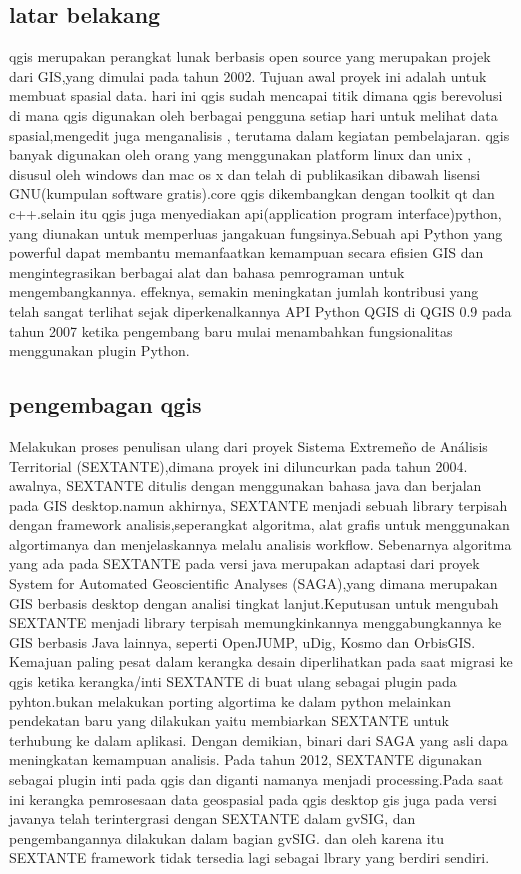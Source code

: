 	 \subsection{latar belakang}
		qgis merupakan perangkat lunak berbasis open source yang merupakan projek dari GIS,yang dimulai pada tahun 2002. Tujuan awal proyek ini adalah untuk membuat spasial data. hari ini qgis sudah mencapai titik dimana qgis berevolusi di mana qgis digunakan oleh berbagai pengguna setiap hari untuk melihat data spasial,mengedit juga menganalisis , terutama dalam kegiatan pembelajaran.
	 qgis banyak digunakan oleh orang yang menggunakan platform linux dan unix , disusul oleh windows dan mac os x dan telah di publikasikan dibawah lisensi GNU(kumpulan software gratis).core qgis dikembangkan dengan toolkit qt dan c++.selain itu qgis juga menyediakan api(application program interface)python, yang diunakan untuk memperluas jangakuan fungsinya.Sebuah api Python yang powerful dapat membantu memanfaatkan kemampuan secara efisien GIS dan mengintegrasikan berbagai alat dan bahasa pemrograman untuk mengembangkannya. 
	 effeknya, semakin meningkatan jumlah kontribusi yang telah sangat terlihat sejak diperkenalkannya API Python QGIS di QGIS 0.9 pada tahun 2007 ketika pengembang baru mulai menambahkan fungsionalitas menggunakan plugin Python.
	 
	 \subsection{pengembagan qgis}
		Melakukan proses penulisan ulang dari proyek Sistema Extremeño de Análisis Territorial (SEXTANTE),dimana proyek ini diluncurkan pada tahun 2004. awalnya, SEXTANTE ditulis dengan menggunakan bahasa java dan berjalan pada GIS desktop.namun akhirnya, SEXTANTE menjadi sebuah library terpisah dengan framework analisis,seperangkat algoritma, alat grafis untuk menggunakan algortimanya dan menjelaskannya melalu analisis workflow.
	 Sebenarnya algoritma yang ada pada SEXTANTE pada versi java merupakan adaptasi dari proyek System for Automated Geoscientific Analyses (SAGA),yang dimana merupakan GIS berbasis desktop dengan analisi tingkat lanjut.Keputusan untuk mengubah SEXTANTE menjadi library terpisah memungkinkannya menggabungkannya ke GIS berbasis Java lainnya, seperti OpenJUMP, uDig, Kosmo dan OrbisGIS.
	 Kemajuan paling pesat dalam kerangka desain diperlihatkan pada saat migrasi ke qgis ketika kerangka/inti SEXTANTE di buat ulang sebagai plugin pada pyhton.bukan melakukan porting algortima ke dalam python melainkan pendekatan baru yang dilakukan yaitu membiarkan SEXTANTE untuk terhubung ke dalam aplikasi. Dengan demikian, binari dari SAGA yang asli dapa meningkatan kemampuan analisis.
	 Pada tahun 2012, SEXTANTE digunakan sebagai plugin inti pada qgis dan diganti namanya menjadi processing\cite{graser2015processing}.Pada saat ini kerangka pemrosesaan data geospasial pada qgis desktop gis juga pada versi javanya telah terintergrasi dengan SEXTANTE dalam gvSIG, dan pengembangannya dilakukan dalam bagian gvSIG. dan oleh karena itu SEXTANTE framework tidak tersedia lagi sebagai lbrary yang berdiri sendiri.
	 

